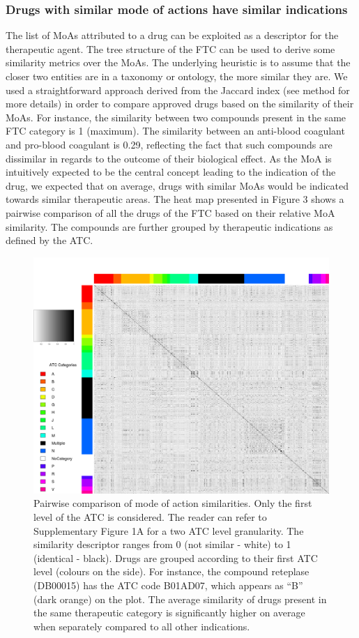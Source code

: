 \documentclass{bioinfo}
\begin{document}
\subsubsection{Drugs with similar mode of actions have similar indications}
The list of MoAs attributed to a drug can be exploited as a descriptor for the therapeutic agent. 
The tree structure of the FTC can be used to derive some similarity metrics over the MoAs. The underlying 
heuristic is to assume that the closer two entities are in a taxonomy or ontology, the more similar they are. 
We used a straightforward approach derived from the Jaccard index (see method for more details) in order to compare 
approved drugs based on the similarity of their MoAs. For instance, the similarity between two compounds present in 
the same FTC category is 1 (maximum). The similarity between an anti-blood coagulant and pro-blood coagulant is 0.29, 
reflecting the fact that such compounds are dissimilar in regards to the outcome of their biological effect. As the MoA is 
intuitively expected to be the central concept leading to the indication of the drug, we expected that on average, drugs with 
similar MoAs would be indicated towards similar therapeutic areas. The heat map presented in Figure 3 shows a pairwise 
comparison of all the drugs of the FTC based on their relative MoA similarity. The compounds are further grouped by 
therapeutic indications as defined by the ATC.

\begin{figure}[!tpb]%
\centerline{\includegraphics{fig4.png}}
\caption{Pairwise comparison of mode of action similarities. Only the first level of 
the ATC is considered. The reader can refer to Supplementary Figure 1A for a two ATC level granularity. 
The similarity descriptor ranges from 0 (not similar - white) to 1 (identical - black). Drugs are grouped according 
to their first ATC level (colours on the side). For instance, the compound reteplase (DB00015) has the ATC code B01AD07, 
which appears as “B” (dark orange) on the plot. The average similarity of drugs present in the same therapeutic category 
is significantly higher on average when separately compared to all other indications.}\label{fig:04}
\end{figure}
\end{document}
